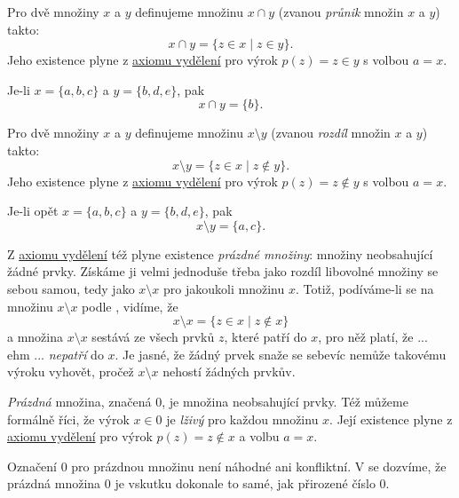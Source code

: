 \begin{definition}
  \label{def:prunik-mnozin}
  Pro dvě množiny $x$ a $y$ definujeme množinu $x \cap y$ (zvanou \emph{průnik}
  množin $x$ a $y$) takto:
  \begin{equation}
    \label{eq:prunik-mnozin}
    x \cap y = \{z \in x \mid z \in y\}.
  \end{equation}
  Jeho existence plyne z \hyperref[eq:axiom-vydeleni]{axiomu vydělení} pro výrok
  $p(z) = z \in y$ s volbou $a = x$.
\end{definition}
\begin{example}
  \label{exam:prunik-mnozin}
  Je-li $x = \{a, b, c\}$ a $y = \{b, d, e\}$, pak
  \[
    x \cap y = \{b\}.
  \]
\end{example}
\lessboxspace
\begin{definition}
  \label{def:rozdil-mnozin}
  Pro dvě množiny $x$ a $y$ definujeme množinu $x \setminus y$ (zvanou
  \emph{rozdíl} množin $x$ a $y$) takto:
  \begin{equation}
    \label{eq:rozdil-mnozin}
    x \setminus y = \{z \in x \mid z \notin y\}.
  \end{equation}
  Jeho existence plyne z \hyperref[eq:axiom-vydeleni]{axiomu vydělení} pro výrok
  $p(z) = z \notin y$ s volbou $a = x$.
\end{definition}
\begin{example}
  \label{exam:rozdil-mnozin}
  Je-li opět $x = \{a, b, c\}$ a $y = \{b, d, e\}$, pak
  \[
    x \setminus y = \{a, c\}.
  \]
\end{example}

Z \hyperref[eq:axiom-vydeleni]{axiomu vydělení} též plyne existence
\emph{prázdné množiny}: množiny neobsahující žádné prvky. Získáme ji velmi
jednoduše třeba jako rozdíl libovolné množiny se sebou samou, tedy jako $x
\setminus x$ pro jakoukoli množinu $x$. Totiž, podíváme-li se na množinu $x
\setminus x$ podle , vidíme, že
\[
  x \setminus x = \{z \in x \mid z \notin x\}
\]
a množina $x \setminus x$ sestává ze všech prvků $z$, které patří do $x$, pro
něž platí, že ... ehm ... \emph{nepatří} do $x$. Je jasné, že žádný prvek snaže
se sebevíc nemůže takovému výroku vyhovět, pročež $x \setminus x$ nehostí
žádných prvkův.

\begin{definition}
  \label{def:prazdna-mnozina}
  \emph{Prázdná} množina, značená $0$, je množina neobsahující prvky. Též můžeme
  formálně říci, že výrok $x \in 0$ je \emph{lživý} pro každou množinu $x$. Její
  existence plyne z \hyperref[eq:axiom-vydeleni]{axiomu vydělení} pro výrok
  $p(z) = z \notin x$ a volbu $a = x$.
\end{definition}
\lessboxspace
\begin{remark}
  Označení $0$ pro prázdnou množinu není náhodné ani konfliktní. V
   se dozvíme, že prázdná množina $0$ je
  vskutku dokonale to samé, jak přirozené číslo $0$.
\end{remark}

